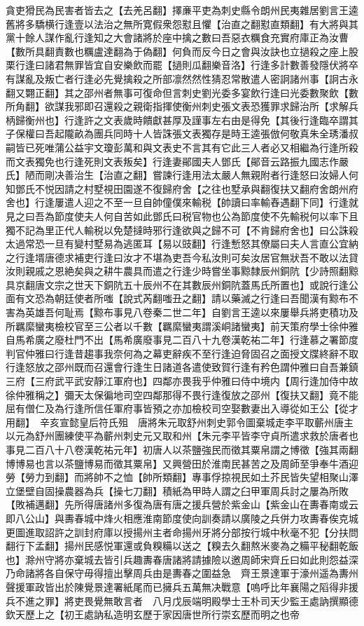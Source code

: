 貪吏猾民為民害者皆去之【去羌呂翻】擇亷平吏為刺史縣令朗州民夷雜居劉言王逵舊將多驕横行逢壹以法治之無所寛假衆怨懟且懼【治直之翻懟直類翻】有大將與其黨十餘人謀作亂行逢知之大會諸將於座中擒之數曰吾惡衣糲食充實府庫正為汝曹【數所具翻責數也糲盧達翻為于偽翻】何負而反今日之會與汝訣也立撾殺之座上股栗行逢曰諸君無罪皆宜自安樂飲而罷【撾則瓜翻樂音洛】行逢多計數善發隱伏將卒有謀亂及叛亡者行逢必先覺擒殺之所部凛然然性猜忍常散遣人密詗諸州事【詗古永翻又翾正翻】其之邵州者無事可復命但言刺史劉光委多宴飲行逢曰光委數聚飲【數所角翻】欲謀我邪即召還殺之親衛指揮使衡州刺史張文表恐獲罪求歸治所【求解兵柄歸衡州也】行逢許之文表歲時饋獻甚厚及謹事左右由是得免【其後行逢臨卒謂其子保權曰吾起隴畝為團兵同時十人皆誅張文表獨存是時王逵張倣何敬真朱全琇潘叔嗣皆已死唯蒲公益宇文瓊彭萬和與文表史不言其有它此三人者必又相繼為行逢所殺而文表獨免也行逢死則文表叛矣】行逢妻鄖國夫人鄧氏【鄖音云路振九國志作嚴氏】陋而剛决善治生【治直之翻】嘗諫行逢用法太嚴人無親附者行逢怒曰汝婦人何知鄧氏不悦因請之村墅視田園遂不復歸府舍【之往也墅承與翻復扶又翻府舍朗州府舍也】行逢屢遣人迎之不至一旦自帥僮僕來輸税【帥讀曰率輸舂遇翻下同】行逢就見之曰吾為節度使夫人何自苦如此鄧氏曰税官物也公為節度使不先輸税何以率下且獨不記為里正代人輸税以免楚撻時邪行逢欲與之歸不可【不肯歸府舍也】曰公誅殺太過常恐一旦有變村墅易為逃匿耳【易以豉翻】行逢慙怒其僚屬曰夫人言直公宜納之行逢壻唐德求補吏行逢曰汝才不堪為吏吾今私汝則可矣汝居官無狀吾不敢以法貸汝則親戚之恩絶矣與之耕牛農具而遣之行逢少時嘗坐事黥隸辰州銅阬【少詩照翻黥具京翻唐文宗之世天下銅阬五十辰州不在其數辰州銅阬蓋馬氏所置也】或說行逢公面有文恐為朝廷使者所嗤【說式芮翻嗤丑之翻】請以藥滅之行逢曰吾聞漢有黥布不害為英雄吾何耻焉【黥布事見八卷秦二世二年】自劉言王逵以來屢舉兵將吏積功及所羈縻蠻夷檢校官至三公者以千數【羈縻蠻夷謂溪峒諸蠻夷】前天策府學士徐仲雅自馬希廣之廢杜門不出【馬希廣廢事見二百八十九卷漢乾祐二年】行逢慕之署節度判官仲雅曰行逢昔趨事我奈何為之幕吏辭疾不至行逢迫脅固召之面授文牒終辭不取行逢怒放之邵州既而召還會行逢生日諸道各遣使致賀行逢有矜色謂仲雅曰自吾兼鎮三府【三府武平武安靜江軍府也】四鄰亦畏我乎仲雅曰侍中境内【周行逢加侍中故徐仲雅稱之】彌天太保徧地司空四鄰那得不畏行逢復放之邵州【復扶又翻】竟不能屈有僧仁及為行逢所信任軍府事皆預之亦加檢校司空娶數妻出入導從如王公【從才用翻】　辛亥宣懿皇后符氏殂　唐將朱元取舒州刺史郭令圖棄城走李平取蘄州唐主以元為舒州團練使平為蘄州刺史元又取和州【朱元李平皆李守貞所遣求救於唐者也事見二百八十八卷漢乾祐元年】初唐人以茶鹽強民而徵其粟帛謂之博徵【強其兩翻博博易也言以茶鹽博易而徵其粟帛】又興營田於淮南民甚苦之及周師至爭奉牛酒迎勞【勞力到翻】而將帥不之恤【帥所類翻】專事俘掠視民如土芥民皆失望相聚山澤立堡壁自固操農器為兵【操七刀翻】積紙為甲時人謂之臼甲軍周兵討之屢為所敗【敗補邁翻】先所得唐諸州多復為唐有唐之援兵營於紫金山【紫金山在夀春南或云即八公山】與夀春城中烽火相應淮南節度使向訓奏請以廣陵之兵併力攻夀春俟克城更圖進取詔許之訓封府庫以授揚州主者命揚州牙將分部按行城中秋毫不犯【分扶問翻行下孟翻】揚州民感悦軍還或負糗糒以送之【糗去久翻熬米麥為之糒平秘翻乾飯也】滁州守將亦棄城去皆引兵趣夀春唐諸將請據險以邀周師宋齊丘曰如此則怨益深乃命諸將各自保守毋得擅出擊周兵由是夀春之圍益急　齊王景達軍于濠州遥為夀州聲援軍政皆出於陳覺景達署紙尾而已擁兵五萬無决戰意【嗚呼比年襄陽之䧟得非援兵不進之罪】將吏畏覺無敢言者　八月戊辰端明殿學士王朴司天少監王處訥撰顯德欽天歷上之【初王處訥私造明玄歷于家因唐世所行崇玄歷而明之也帝